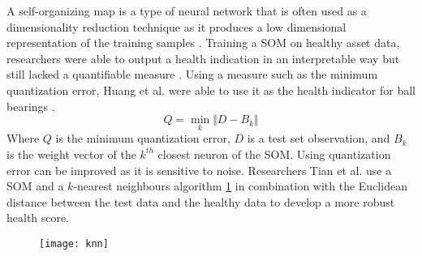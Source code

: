 A self-organizing map is a type of neural network that is often used as a dimensionality reduction technique as it produces a low dimensional representation of the training samples \cite{map1990self}.
Training a SOM on healthy asset data, researchers were able to output a health indication in an interpretable way but still lacked a quantifiable measure \cite{5524339}.
Using a measure such as the minimum quantization error, Huang et al. were able to use it as the health indicator for ball bearings \cite{som-1}.
\begin{equation}
	Q = \min_{k} \Vert D-B_k \Vert
\end{equation}
 Where $Q$ is the minimum quantization error, $D$ is a test set observation, and $B_k$ is the weight vector of the $k^{th}$ closest neuron of the SOM.
Using quantization error can be improved as it is sensitive to noise.
Researchers Tian et al. use a SOM and a $k$-nearest neighbours algorithm \ref{fig:knn} in combination with the Euclidean distance between the test data and the healthy data to develop a more robust health score.
\begin{figure}[!h]
    \texttt{[image: knn]}
    \centering
    \label{fig:knn}
\end{figure}
